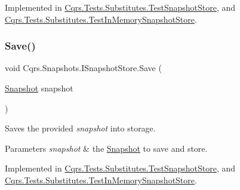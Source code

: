 Implemented in \hyperlink{classCqrs_1_1Tests_1_1Substitutes_1_1TestSnapshotStore_adc420bde9bd2e180a89a3a914e72691a_adc420bde9bd2e180a89a3a914e72691a}{Cqrs.\+Tests.\+Substitutes.\+Test\+Snapshot\+Store}, and \hyperlink{classCqrs_1_1Tests_1_1Substitutes_1_1TestInMemorySnapshotStore_a8600a3211dd09e9fe2e2292a031f0d47_a8600a3211dd09e9fe2e2292a031f0d47}{Cqrs.\+Tests.\+Substitutes.\+Test\+In\+Memory\+Snapshot\+Store}.

\mbox{\label{interfaceCqrs_1_1Snapshots_1_1ISnapshotStore_a6e99c620115ce8a0648a83bf2ce05527_a6e99c620115ce8a0648a83bf2ce05527}} 
\subsubsection{\texorpdfstring{Save()}{Save()}}
{\footnotesize\ttfamily void Cqrs.\+Snapshots.\+I\+Snapshot\+Store.\+Save (\begin{DoxyParamCaption}\item[{\hyperlink{classCqrs_1_1Snapshots_1_1Snapshot}{Snapshot}}]{snapshot }\end{DoxyParamCaption})}



Saves the provided {\itshape snapshot}  into storage. 


\begin{DoxyParams}{Parameters}
{\em snapshot} & the \hyperlink{classCqrs_1_1Snapshots_1_1Snapshot}{Snapshot} to save and store.\\
\hline
\end{DoxyParams}


Implemented in \hyperlink{classCqrs_1_1Tests_1_1Substitutes_1_1TestSnapshotStore_a223dbc9583120dec1469c1f84b863eae_a223dbc9583120dec1469c1f84b863eae}{Cqrs.\+Tests.\+Substitutes.\+Test\+Snapshot\+Store}, and \hyperlink{classCqrs_1_1Tests_1_1Substitutes_1_1TestInMemorySnapshotStore_afec5ba3ed2b39625b3ccfb002d1c935e_afec5ba3ed2b39625b3ccfb002d1c935e}{Cqrs.\+Tests.\+Substitutes.\+Test\+In\+Memory\+Snapshot\+Store}.

